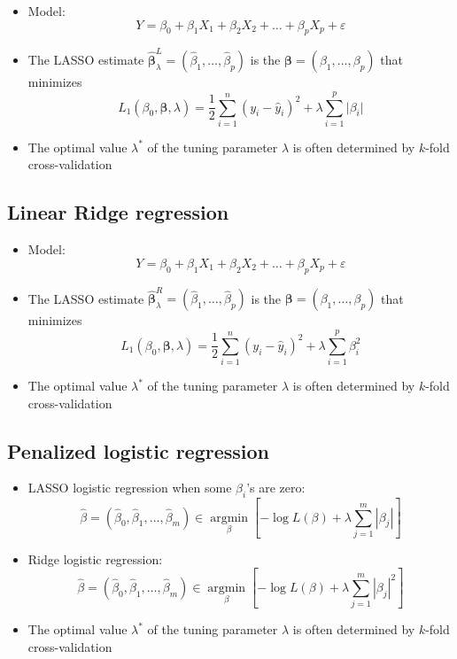 \documentclass[]{article}
\providecommand{\tightlist}{%
  \setlength{\itemsep}{0pt}\setlength{\parskip}{0pt}}
\begin{document}
\begin{itemize}
\item
  Model:
  \[Y=\beta_0+\beta_1 X_1 + \beta_2 X_2 + \ldots + \beta_p X_p + \varepsilon\]
\item
  The LASSO estimate
  \(\hat{\boldsymbol{\beta}}^L_{\lambda}=(\hat{\beta}_1,\ldots,\hat{\beta}_p)\)
  is the \({\boldsymbol{\beta}}=({\beta}_1,\ldots,{\beta}_p)\) that
  minimizes \[
  L_1(\beta_0,\boldsymbol{\beta},\lambda)= \frac{1}{2}\sum_{i=1}^n (y_i - \hat{y}_i)^2 + \lambda \sum_{i=1}^p\vert \beta_i \vert
  \]
\item
  The optimal value \(\lambda^{\ast}\) of the tuning parameter
  \(\lambda\) is often determined by \(k\)-fold cross-validation
\end{itemize}

\subsection{Linear Ridge regression}\label{linear-ridge-regression}

\begin{itemize}
\item
  Model:
  \[Y=\beta_0+\beta_1 X_1 + \beta_2 X_2 + \ldots + \beta_p X_p + \varepsilon\]
\item
  The LASSO estimate
  \(\hat{\boldsymbol{\beta}}^R_{\lambda}=(\hat{\beta}_1,\ldots,\hat{\beta}_p)\)
  is the \({\boldsymbol{\beta}}=({\beta}_1,\ldots,{\beta}_p)\) that
  minimizes \[
  L_1(\beta_0,\boldsymbol{\beta},\lambda)= \frac{1}{2}\sum_{i=1}^n (y_i - \hat{y}_i)^2 + \lambda \sum_{i=1}^p  \beta_i^2
  \]
\item
  The optimal value \(\lambda^{\ast}\) of the tuning parameter
  \(\lambda\) is often determined by \(k\)-fold cross-validation
\end{itemize}

\subsection{Penalized logistic
regression}\label{penalized-logistic-regression}

\begin{itemize}
\tightlist
\item
  LASSO logistic regression when some \(\beta_{i}\)'s are zero: \[
  \hat{\beta}=\left(  \hat{\beta}_{0},\hat{\beta}_{1},\ldots,\hat{\beta}
  _{m}\right)  \in\operatorname*{argmin}_{\beta}\left[ -\log L\left(  \beta\right)
  +\lambda\sum_{j=1}^{m}\left\vert \beta_{j}\right\vert \right]
  \]
\item
  Ridge logistic regression: \[
  \hat{\beta}=\left(  \hat{\beta}_{0},\hat{\beta}_{1},\ldots,\hat{\beta}
  _{m}\right)  \in\operatorname*{argmin}_{\beta}\left[ - \log L\left(  \beta\right)
  +\lambda\sum_{j=1}^{m}\left\vert \beta_{j}\right\vert ^{2}\right]
  \]
\item
  The optimal value \(\lambda^{\ast}\) of the tuning parameter
  \(\lambda\) is often determined by \(k\)-fold cross-validation
\end{itemize}
\end{document}
